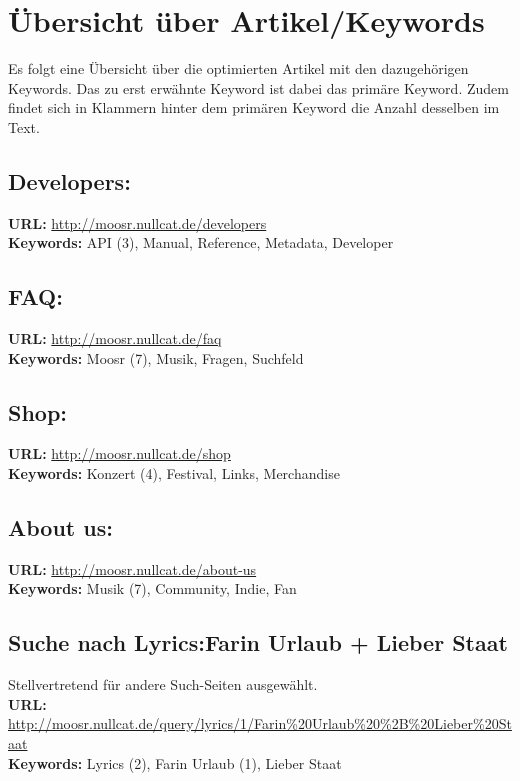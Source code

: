 \section{Übersicht über Artikel/Keywords}

Es folgt eine Übersicht über die optimierten Artikel mit den dazugehörigen 
Keywords. Das zu erst erwähnte Keyword ist dabei das primäre Keyword.
Zudem findet sich in Klammern hinter dem primären Keyword die Anzahl desselben
im Text.

\subsection{Developers:} 

\textbf{URL:} \url{http://moosr.nullcat.de/developers}
\\
\textbf{Keywords:} API (3), Manual, Reference, Metadata, Developer

\subsection{FAQ:} 

\textbf{URL:} \url{http://moosr.nullcat.de/faq}
\\
\textbf{Keywords:} Moosr (7), Musik, Fragen, Suchfeld

\subsection{Shop:}

\textbf{URL:} \url{http://moosr.nullcat.de/shop}
\\
\textbf{Keywords:} Konzert (4), Festival, Links, Merchandise

\subsection{About us:} 

\textbf{URL:} \url{http://moosr.nullcat.de/about-us}
\\
\textbf{Keywords:} Musik (7), Community, Indie, Fan 

\subsection{Suche nach Lyrics:Farin Urlaub + Lieber Staat} 

Stellvertretend für andere Such-Seiten ausgewählt.
\\
\textbf{URL:} \url{http://moosr.nullcat.de/query/lyrics/1/Farin\%20Urlaub\%20\%2B\%20Lieber\%20Staat}
\\ 
\textbf{Keywords:} Lyrics (2), Farin Urlaub (1), Lieber Staat

